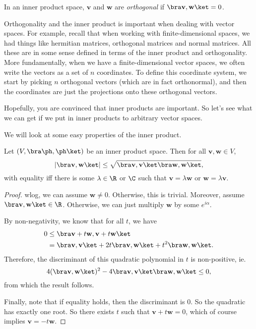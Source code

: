 \documentclass[a4paper]{article}
\begin{document}
\begin{defi}[Orthogonality]
  In an inner product space, $\mathbf{v}$ and $\mathbf{w}$ are \emph{orthogonal} if $\bra \mathbf{v}, \mathbf{w} \ket = 0$.
\end{defi}

Orthogonality and the inner product is important when dealing with vector spaces. For example, recall that when working with finite-dimensional spaces, we had things like hermitian matrices, orthogonal matrices and normal matrices. All these are in some sense defined in terms of the inner product and orthogonality. More fundamentally, when we have a finite-dimensional vector spaces, we often write the vectors as a set of $n$ coordinates. To define this coordinate system, we start by picking $n$ orthogonal vectors (which are in fact orthonormal), and then the coordinates are just the projections onto these orthogonal vectors.

Hopefully, you are convinced that inner products are important. So let's see what we can get if we put in inner products to arbitrary vector spaces.


We will look at some easy properties of the inner product.
\begin{prop}
  Let $(V, \bra \ph,\ph\ket)$ be an inner product space. Then for all $\mathbf{v}, \mathbf{w} \in V$,
  \[
    |\bra \mathbf{v}, \mathbf{w}\ket| \leq \sqrt{\bra \mathbf{v}, \mathbf{v}\ket \bra \mathbf{w}, \mathbf{w}\ket},
  \]
  with equality iff there is some $\lambda \in \R$ or $\C$ such that $\mathbf{v} = \lambda \mathbf{w}$ or $\mathbf{w} = \lambda \mathbf{v}$.
\end{prop}

\begin{proof}
  wlog, we can assume $\mathbf{w} \not= 0$. Otherwise, this is trivial. Moreover, assume $\bra \mathbf{v}, \mathbf{w}\ket \in \R$. Otherwise, we can just multiply $\mathbf{w}$ by some $e^{i\alpha}$.

  By non-negativity, we know that for all $t$, we have
  \begin{align*}
    0 &\leq \bra \mathbf{v} + t\mathbf{w}, \mathbf{v} + t\mathbf{w}\ket\\
    &= \bra \mathbf{v}, \mathbf{v}\ket + 2t\bra \mathbf{v}, \mathbf{w}\ket + t^2 \bra \mathbf{w}, \mathbf{w}\ket.
  \end{align*}
  Therefore, the discriminant of this quadratic polynomial in $t$ is non-positive, ie.
  \[
    4(\bra \mathbf{v}, \mathbf{w}\ket)^2 - 4\bra \mathbf{v}, \mathbf{v}\ket \bra \mathbf{w}, \mathbf{w}\ket \leq 0,
  \]
  from which the result follows.

  Finally, note that if equality holds, then the discriminant is $0$. So the quadratic has exactly one root. So there exists $t$ such that $\mathbf{v} + t\mathbf{w} = 0$, which of course implies $\mathbf{v} = -t\mathbf{w}$.
\end{proof}
\end{document}
